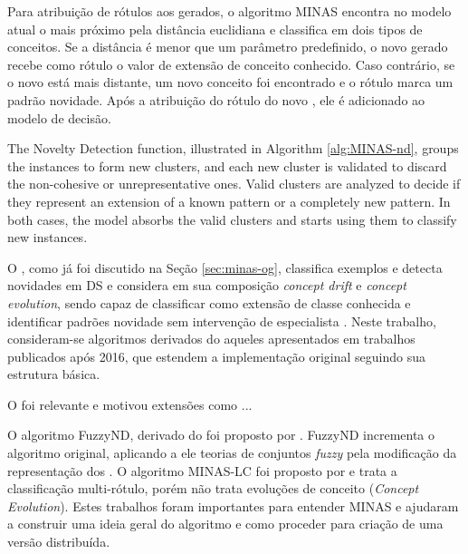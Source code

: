 Para atribuição de rótulos aos \mclusters gerados, o algoritmo MINAS
encontra no modelo atual o \mcluster mais próximo pela distância
euclidiana e classifica em dois tipos de conceitos.
Se a distância é menor que um parâmetro predefinido,
o novo \mcluster gerado recebe como rótulo o valor de extensão
de conceito conhecido.
Caso contrário, se o novo \mcluster está mais distante,
um novo conceito foi encontrado e o rótulo marca um padrão novidade.
Após a atribuição do rótulo do novo \mcluster, ele é adicionado
ao modelo de decisão.


The Novelty Detection function, illustrated in Algorithm \ref{alg:MINAS-nd},
groups the instances to form new clusters, and each new cluster is validated to
discard the non-cohesive or unrepresentative ones.
Valid clusters are analyzed to decide if they represent an extension of a
known pattern or a completely new pattern. In both cases, the model absorbs the
valid clusters and starts using them to classify new instances.

O \minas, como já foi discutido na Seção \ref{sec:minas-og}, classifica
exemplos e detecta
novidades em DS e considera em sua composição \emph{concept drift} e
\emph{concept evolution}, sendo capaz de classificar como extensão de classe
conhecida e identificar padrões novidade sem intervenção de especialista
\cite{Faria2016minas}.
Neste trabalho, consideram-se algoritmos derivados do \minas
aqueles apresentados em trabalhos publicados após 2016, que estendem a
implementação original seguindo sua estrutura básica.

O \minas foi relevante e motivou extensões como \cite{DaSilva2018,Costa2019}...

O algoritmo FuzzyND, derivado do \minas foi proposto por .
FuzzyND incrementa o algoritmo original, aplicando a ele teorias de
conjuntos \emph{fuzzy} pela modificação da representação dos \clusters.
O algoritmo MINAS-LC foi proposto por  e trata a
classificação multi-rótulo, porém não trata evoluções de conceito (\emph{Concept
Evolution}).
Estes trabalhos foram importantes para entender MINAS e ajudaram a construir uma
ideia geral do algoritmo e como proceder para criação de uma versão distribuída.

